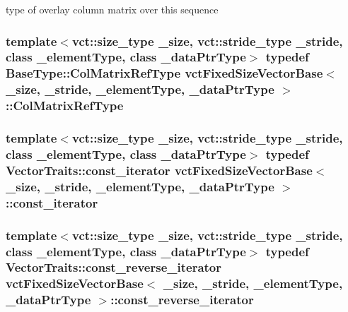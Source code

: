 type of overlay column matrix over this sequence \hypertarget{classvct_fixed_size_vector_base_a6b661e308612cbe1c894c62812c272e2}{
\subsubsection[{Col\-Matrix\-Ref\-Type}]{\setlength{\rightskip}{0pt plus 5cm}template$<$vct\-::size\-\_\-type \-\_\-size, vct\-::stride\-\_\-type \-\_\-stride, class \-\_\-element\-Type, class \-\_\-data\-Ptr\-Type$>$ typedef {\bf Base\-Type\-::\-Col\-Matrix\-Ref\-Type} {\bf vct\-Fixed\-Size\-Vector\-Base}$<$ \-\_\-size, \-\_\-stride, \-\_\-element\-Type, \-\_\-data\-Ptr\-Type $>$\-::{\bf Col\-Matrix\-Ref\-Type}}}\label{classvct_fixed_size_vector_base_a6b661e308612cbe1c894c62812c272e2}
\hypertarget{classvct_fixed_size_vector_base_a178701dffe8173212039cd3edcb8697d}{
\subsubsection[{const\-\_\-iterator}]{\setlength{\rightskip}{0pt plus 5cm}template$<$vct\-::size\-\_\-type \-\_\-size, vct\-::stride\-\_\-type \-\_\-stride, class \-\_\-element\-Type, class \-\_\-data\-Ptr\-Type$>$ typedef {\bf Vector\-Traits\-::const\-\_\-iterator} {\bf vct\-Fixed\-Size\-Vector\-Base}$<$ \-\_\-size, \-\_\-stride, \-\_\-element\-Type, \-\_\-data\-Ptr\-Type $>$\-::{\bf const\-\_\-iterator}}}\label{classvct_fixed_size_vector_base_a178701dffe8173212039cd3edcb8697d}
\hypertarget{classvct_fixed_size_vector_base_a51b27cb7a2a0f7cd5c3352deda9bce98}{
\subsubsection[{const\-\_\-reverse\-\_\-iterator}]{\setlength{\rightskip}{0pt plus 5cm}template$<$vct\-::size\-\_\-type \-\_\-size, vct\-::stride\-\_\-type \-\_\-stride, class \-\_\-element\-Type, class \-\_\-data\-Ptr\-Type$>$ typedef {\bf Vector\-Traits\-::const\-\_\-reverse\-\_\-iterator} {\bf vct\-Fixed\-Size\-Vector\-Base}$<$ \-\_\-size, \-\_\-stride, \-\_\-element\-Type, \-\_\-data\-Ptr\-Type $>$\-::{\bf const\-\_\-reverse\-\_\-iterator}}}\label{classvct_fixed_size_vector_base_a51b27cb7a2a0f7cd5c3352deda9bce98}
